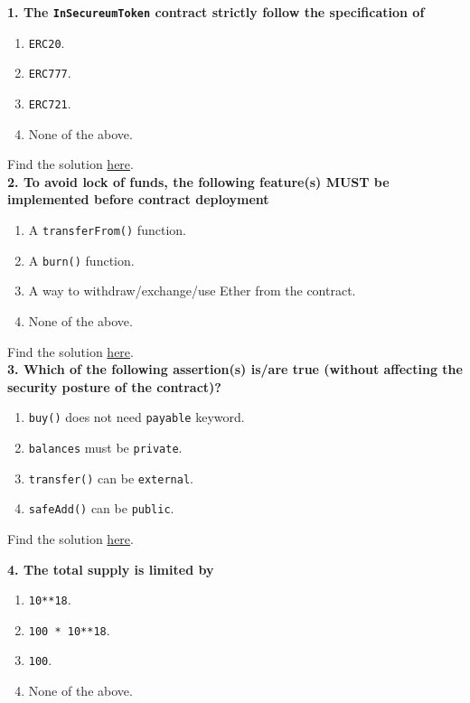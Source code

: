 \pagebreak

\textbf{1. The \texttt{InSecureumToken} contract strictly follow the specification of}

\begin{enumerate}[label=\Alph*.]
    \item\verb|ERC20|.
    \item\verb|ERC777|.
    \item\verb|ERC721|.
    \item None of the above.
\end{enumerate}

Find the solution \hyperref[sec:exam5_q1]{here}.\\

\textbf{2. To avoid lock of funds, the following feature(s) MUST be implemented before contract deployment}

\begin{enumerate}[label=\Alph*.]
    \item A \verb|transferFrom()| function.
    \item A \verb|burn()| function.
    \item A way to withdraw/exchange/use Ether from the contract.
    \item None of the above.
\end{enumerate}

Find the solution \hyperref[sec:exam5_q2]{here}.\\

\textbf{3. Which of the following assertion(s) is/are true (without affecting the security posture of the contract)?}

\begin{enumerate}[label=\Alph*.]
    \item \verb|buy()| does not need \verb|payable| keyword.
    \item \verb|balances| must be \verb|private|.
    \item \verb|transfer()| can be \verb|external|.
    \item \verb|safeAdd()| can be \verb|public|.
\end{enumerate}

Find the solution \hyperref[sec:exam5_q3]{here}.\\

\pagebreak

\textbf{4. The total supply is limited by}

\begin{enumerate}[label=\Alph*.]
    \item \verb|10**18|.
    \item \verb|100 * 10**18|.
    \item \verb|100|.
    \item None of the above.
\end{enumerate}

